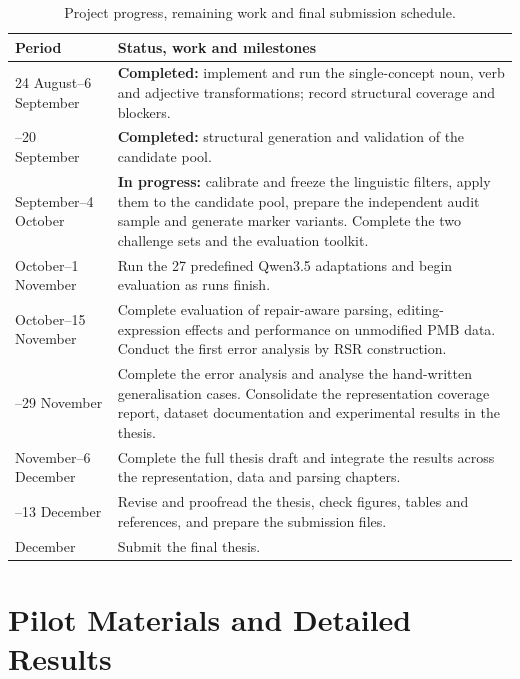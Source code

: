 \documentclass{article}
\begin{document}
\begin{table}[ht]
\centering
\small
\setlength{\tabcolsep}{4pt}
\begin{tabular}{@{}p{}p{}@{}}
\toprule
\textbf{Period} & \textbf{Status, work and milestones} \\
\midrule
24 August--6 September
  & \textbf{Completed:} implement and run the single-concept noun, verb and
    adjective transformations; record structural coverage and blockers. \\
\addlinespace
7--20 September
  & \textbf{Completed:} structural generation and validation of the candidate
    pool. \\
\addlinespace
21 September--4 October
  & \textbf{In progress:} calibrate and freeze the linguistic filters, apply
    them to the candidate pool, prepare the independent audit sample and
    generate marker variants. Complete the two challenge sets and the
    evaluation toolkit. \\
\addlinespace
5 October--1 November
  & Run the 27 predefined Qwen3.5 adaptations and begin evaluation as
    runs finish. \\
\addlinespace
26 October--15 November
  & Complete evaluation of repair-aware parsing, editing-expression effects and
    performance on unmodified PMB data. Conduct the first error analysis by
    RSR construction.  \\
\addlinespace
16--29 November
  & Complete the error analysis and analyse the hand-written generalisation
    cases. Consolidate the representation coverage report, dataset documentation
    and experimental results in the thesis. \\
\addlinespace
30 November--6 December
  & Complete the full thesis draft and integrate the results across the
    representation, data and parsing chapters. \\
\addlinespace
7--13 December
  & Revise and proofread the thesis, check figures, tables and references, and
    prepare the submission files. \\
\addlinespace
14 December
  & Submit the final thesis. \\
\bottomrule
\end{tabular}
\caption{Project progress, remaining work and final submission schedule.}
\label{tab:timeline}
\end{table}

\clearpage


\appendix

\section{Pilot Materials and Detailed Results}
\label{app:pilot-results}
\end{document}
